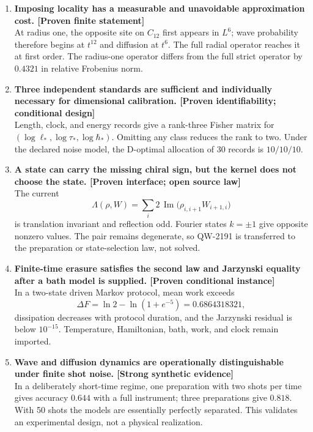 \documentclass[11pt,a4paper,openany]{report}
\begin{document}
\begin{enumerate}
\item 
\textbf{Imposing locality has a measurable and unavoidable approximation cost. [Proven finite statement]}\\
At radius one, the opposite site on \(C_{12}\) first appears in \(L^6\); wave probability therefore begins at \(t^{12}\) and diffusion at \(t^6\). The full radial operator reaches it at first order. The radius-one operator differs from the full strict operator by \(0.4321\) in relative Frobenius norm.

\item 
\textbf{Three independent standards are sufficient and individually necessary for dimensional calibration. [Proven identifiability; conditional design]}\\
Length, clock, and energy records give a rank-three Fisher matrix for \((\log\ell_*,\log\tau_*,\log\hbar_*)\). Omitting any class reduces the rank to two. Under the declared noise model, the D-optimal allocation of 30 records is \(10/10/10\).

\item 
\textbf{A state can carry the missing chiral sign, but the kernel does not choose the state. [Proven interface; open source law]}\\
The current \[
   \Lambda(\rho,W)
   =
   \sum_i 2\,\operatorname{Im}
   \bigl(\rho_{i,i+1}W_{i+1,i}\bigr)
   \] is translation invariant and reflection odd. Fourier states \(k=\pm1\) give opposite nonzero values. The pair remains degenerate, so QW-2191 is transferred to the preparation or state-selection law, not solved.

\item 
\textbf{Finite-time erasure satisfies the second law and Jarzynski equality after a bath model is supplied. [Proven conditional instance]}\\
In a two-state driven Markov protocol, mean work exceeds \[
   \Delta F
   =
   \ln2-\ln(1+e^{-5})
   =
   0.6864318321,
   \] dissipation decreases with protocol duration, and the Jarzynski residual is below \(10^{-15}\). Temperature, Hamiltonian, bath, work, and clock remain imported.

\item 
\textbf{Wave and diffusion dynamics are operationally distinguishable under finite shot noise. [Strong synthetic evidence]}\\
In a deliberately short-time regime, one preparation with two shots per time gives accuracy \(0.644\) with a full instrument; three preparations give \(0.818\). With 50 shots the models are essentially perfectly separated. This validates an experimental design, not a physical realization.


\end{enumerate}
\end{document}

